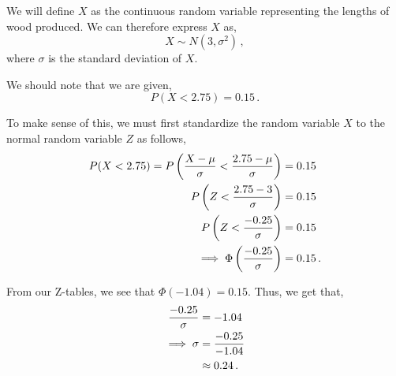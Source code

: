 %
%


\begin{subquestions}

\subquestion

We will define $X$ as the continuous random variable representing the lengths of wood produced. We can therefore express $X$ as,
\begin{equation}
	X \sim N(3, \sigma^2) \,,
\end{equation}	
where $\sigma$ is the standard deviation of $X$.
	
\begin{subsubquestions}
	
\subsubquestion

We should note that we are given,
\begin{equation}
	P(X<2.75) = 0.15 \,.
\end{equation}
	
To make sense of this, we must first standardize the random variable $X$ to the normal random variable $Z$ as follows,
\begin{align}
	P(X<2.75) = P\left(\frac{X - \mu}{\sigma}<\frac{2.75-\mu}{\sigma}\right) & = 0.15 \nonumber \\
	            P\left(Z <\frac{2.75-3}{\sigma}\right) & = 0.15 \nonumber \\
	            P\left(Z <\frac{-0.25}{\sigma}\right) & = 0.15 \nonumber \\
	            \implies \Phi\left(\frac{-0.25}{\sigma}\right) & = 0.15 \,.
\end{align}

From our Z-tables, we see that $\Phi(-1.04)=0.15$. Thus, we get that,
\begin{align}
	\frac{-0.25}{\sigma} & = -1.04 \nonumber \\
	\implies \sigma & = \frac{-0.25}{-1.04} \nonumber \\
	                & \approx 0.24 \,.
\end{align}


\end{subsubquestions}
\end{subquestions}
